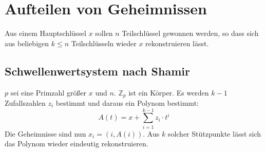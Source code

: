 \chapter{Aufteilen von Geheimnissen}
Aus einem Hauptschlüssel $x$ sollen $n$ Teilschlüssel gewonnen werden, so dass
sich aus beliebigen $k \leq n$ Teilschlüsseln wieder $x$ rekonstruieren lässt.

\section{Schwellenwertsystem nach Shamir}
$p$ sei eine Primzahl größer $x$ und $n$. $\mathbb{Z}_p$ ist ein Körper.
Es werden $k-1$ Zufallszahlen $z_i$ bestimmt und daraus ein Polynom bestimmt:
\begin{equation}
    A(t) = x + \sum_{i=1}^{k-1} z_i \cdot t^i
\end{equation}
Die Geheimnisse sind nun $x_i = (i, A(i))$. Aus $k$ solcher Stützpunkte
lässt sich das Polynom wieder eindeutig rekonstruieren.
